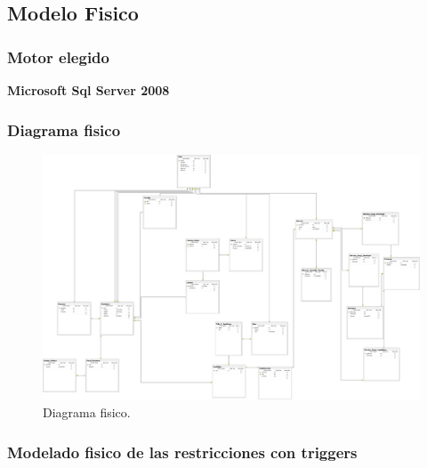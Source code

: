 \subsection{Modelo Fisico}
\subsubsection{Motor elegido}

\textbf{Microsoft Sql Server 2008}

\subsubsection{Diagrama fisico}
\begin{landscape}
	\begin{figure}[t]
	  \centering	
		\includegraphics[scale=0.35]{fig/modelo-fisico.png}
	  \caption{Diagrama fisico.}
	\end{figure}
\end{landscape}
\subsubsection{Modelado fisico de las restricciones con triggers}
